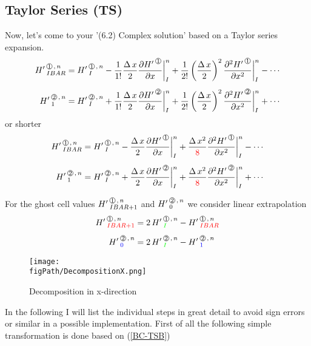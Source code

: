 \subsection{Taylor Series (TS)}

Now, let's come to your '(6.2) Complex solution' based on a Taylor series expansion.
\begin{align}
\HL{IBAR}{1}{n}  & =  \HL{I}{1}{n} - \frac{1}{1!}\frac{\DX}{2} \frac{\HPN{1}} {\DXP} \bigg|_{I}^n 
                                                    + \frac{1}{2!}\left(\frac{\DX}{2}\right)^2 \frac{\HPNT{1}} {\DXPT} \bigg|_{I}^n  - \cdots \label{BC-TSA}
 \\[1ex]
\HL{1}{2}{n}  & =  \HL{I}{2}{n} + \frac{1}{1!}\frac{\DX}{2} \frac{\HPN{2}} {\DXP} \bigg|_{I}^n 
                                                    + \frac{1}{2!}\left(\frac{\DX}{2}\right)^2 \frac{\HPNT{2}} {\DXPT} \bigg|_{I}^n  + \cdots   \nonumber                                                         
\end{align}
or shorter
\begin{align}
\HL{IBAR}{1}{n}  & =  \HL{I}{1}{n} - \frac{\DX}{2} \frac{\HPN{1}} {\DXP} \bigg|_{I}^n 
                                                     + \frac{\DXT}{\color{red}{8}} \frac{\HPNT{1}} {\DXPT} \bigg|_{I}^n  - \cdots \label{BC-TSB}
 \\[1ex]
\HL{1}{2}{n}  & =  \HL{I}{2}{n} + \frac{\DX}{2} \frac{\HPN{2}} {\DXP} \bigg|_{I}^n 
                                                     + \frac{\DXT}{\color{red}{8}}\frac{\HPNT{2}} {\DXPT} \bigg|_{I}^n  + \cdots    \nonumber                                                 
\end{align}



For the ghost cell values $\HL{IBAR+1}{1}{n}$ and $\HL{0}{2}{n}$ we consider linear extrapolation
\begin{align}
\label{Extrapolation}
\HL{{\color{red}{IBAR+1}}}{1}{n} & = 2\, \HL{{\color{green}{I}}}{1}{n} -  \HL{{\color{red}{IBAR}}}{1}{n} \\[1ex]
\HL{{\color{blue}{0}}}{2}{n} & = 2 \,\HL{{\color{green}{I}}}{2}{n} -  \HL{{\color{blue}{1}}}{2}{n}   \nonumber     
\end{align}

\begin{figure}[H]
\begin{center}
\texttt{[image: \\figPath/DecompositionX.png]}
\end{center}
\caption{Decomposition in x-direction}
\label{FIG_DecompositionX}
\end{figure}
In the following I will list the individual steps in great detail to avoid sign errors or similar in a possible implementation. 
First of all the following simple transformation is done based on (\ref{BC-TSB})



